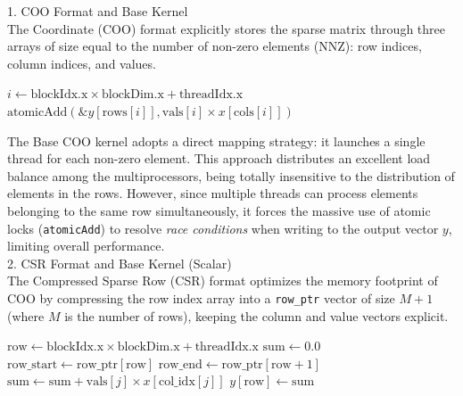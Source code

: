 \documentclass[conference]{IEEEtran}
\begin{document}
1. COO Format and Base Kernel\\
The Coordinate (COO) format explicitly stores the sparse matrix through three arrays of size equal to the number of non-zero elements (NNZ): row indices, column indices, and values.

\begin{algorithm}[h]
\caption{SpMV Kernel - GPU Base COO}\label{alg:coo}
\begin{algorithmic}[1]
\STATE $i \gets \text{blockIdx.x} \times \text{blockDim.x} + \text{threadIdx.x}$
    \STATE $\text{atomicAdd}(\&y[\text{rows}[i]], \text{vals}[i] \times x[\text{cols}[i]])$
\ENDIF
\end{algorithmic}
\end{algorithm}

The Base COO kernel adopts a direct mapping strategy: it launches a single thread for each non-zero element. This approach distributes an excellent load balance among the multiprocessors, being totally insensitive to the distribution of elements in the rows. However, since multiple threads can process elements belonging to the same row simultaneously, it forces the massive use of atomic locks (\texttt{atomicAdd}) to resolve \textit{race conditions} when writing to the output vector $y$, limiting overall performance.\\

2. CSR Format and Base Kernel (Scalar)\\
The Compressed Sparse Row (CSR) format optimizes the memory footprint of COO by compressing the row index array into a \texttt{row\_ptr} vector of size $M+1$ (where $M$ is the number of rows), keeping the column and value vectors explicit.

\begin{algorithm}[h]
\caption{SpMV Kernel - GPU Base CSR}\label{alg:csr}
\begin{algorithmic}[1]
\STATE $\text{row} \gets \text{blockIdx.x} \times \text{blockDim.x} + \text{threadIdx.x}$
    \STATE $\text{sum} \gets 0.0$
    \STATE $\text{row\_start} \gets \text{row\_ptr}[\text{row}]$
    \STATE $\text{row\_end} \gets \text{row\_ptr}[\text{row} + 1]$
        \STATE $\text{sum} \gets \text{sum} + \text{vals}[j] \times x[\text{col\_idx}[j]]$
    \ENDFOR
    \STATE $y[\text{row}] \gets \text{sum}$
\ENDIF
\end{algorithmic}
\end{algorithm}
\end{document}
